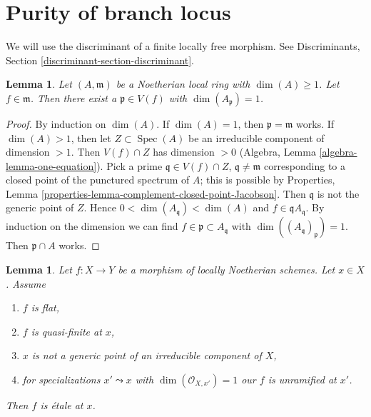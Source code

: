 \documentclass{stacks-project}
\theoremstyle{plain}
\newtheorem{lemma}[subsection]{Lemma}
\theoremstyle{definition}
\theoremstyle{remark}
\numberwithin{equation}{subsection}
\def\Spec{\mathop{\mathrm{Spec}}}
\begin{document}
\section{Purity of branch locus}
\label{section-purity}

\noindent
We will use the discriminant of a finite locally free morphism. See
Discriminants, Section \ref{discriminant-section-discriminant}.

\begin{lemma}
\label{lemma-find-point-codim-1}
Let $(A, \mathfrak m)$ be a Noetherian local ring with $\dim(A) \geq 1$.
Let $f \in \mathfrak m$. Then there exist a $\mathfrak p \in V(f)$ with
$\dim(A_\mathfrak p) = 1$.
\end{lemma}

\begin{proof}
By induction on $\dim(A)$. If $\dim(A) = 1$, then $\mathfrak p = \mathfrak m$
works. If $\dim(A) > 1$, then let $Z \subset \Spec(A)$ be an irreducible
component of dimension $> 1$. Then $V(f) \cap Z$ has dimension $> 0$
(Algebra, Lemma \ref{algebra-lemma-one-equation}). Pick a prime
$\mathfrak q \in V(f) \cap Z$, $\mathfrak q \not = \mathfrak m$
corresponding to a closed point of the punctured spectrum of $A$;
this is possible by
Properties, Lemma \ref{properties-lemma-complement-closed-point-Jacobson}.
Then $\mathfrak q$ is not the generic point of $Z$. Hence
$0 < \dim(A_\mathfrak q) < \dim(A)$ and $f \in \mathfrak q A_\mathfrak q$.
By induction on the dimension we can find
$f \in \mathfrak p \subset A_\mathfrak q$ with
$\dim((A_\mathfrak q)_\mathfrak p) = 1$.
Then $\mathfrak p \cap A$ works.
\end{proof}

\begin{lemma}
\label{lemma-ramification-quasi-finite-flat}
Let $f : X \to Y$ be a morphism of locally Noetherian schemes.
Let $x \in X$. Assume
\begin{enumerate}
\item $f$ is flat,
\item $f$ is quasi-finite at $x$,
\item $x$ is not a generic point of an irreducible component of $X$,
\item for specializations $x' \leadsto x$ with
$\dim(\mathcal{O}_{X, x'}) = 1$ our $f$ is unramified at $x'$.
\end{enumerate}
Then $f$ is \'etale at $x$.
\end{lemma}
\end{document}
